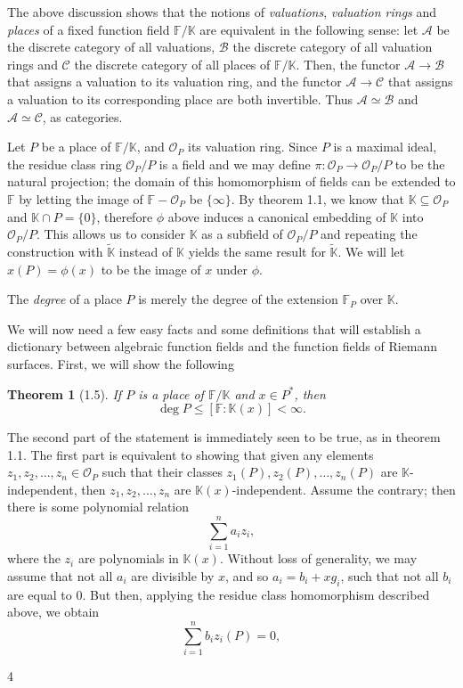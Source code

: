 \documentclass[11pt]{article}
\theoremstyle{scplain}
\newtheorem*{theorem}{Theorem}
\begin{document}
The above discussion shows that the notions of \emph{valuations}, \emph{valuation
rings} and \emph{places} of a fixed function field $\mathbb{F}/\mathbb{K}$ are
equivalent in the following sense: let $\mathcal{A}$ be the discrete category of
all valuations, $\mathcal{B}$ the discrete category of all valuation rings and
$\mathcal{C}$ the discrete category of all places of $\mathbb{F}/\mathbb{K}$.
Then, the functor $\mathcal{A} \longrightarrow \mathcal{B}$ that assigns a
valuation to its valuation ring, and the functor
$\mathcal{A} \longrightarrow \mathcal{C}$ that assigns a valuation to its
corresponding place are both invertible. Thus $\mathcal{A} \simeq \mathcal{B}$ and
$\mathcal{A} \simeq \mathcal{C}$, as categories.

Let $P$ be a place of $\mathbb{F}/\mathbb{K}$, and $\mathcal{O}_P$ its valuation
ring. Since $P$ is a maximal ideal, the residue class ring $\mathcal{O}_P/P$ is a
field and we may define $\pi : \mathcal{O}_P \longrightarrow \mathcal{O}_P/P$ to be
the natural projection; the domain of this homomorphism of fields can be extended
to $\mathbb{F}$ by letting the image of $\mathbb{F} - \mathcal{O}_P$ be
$\{\infty\}$. By theorem 1.1, we know that $\mathbb{K} \subseteq \mathcal{O}_P$ and
$\mathbb{K} \cap P = \{0\}$, therefore $\phi$ above induces a canonical embedding
of $\mathbb{K}$ into $\mathcal{O}_P/P$. This allows us to consider $\mathbb{K}$ as
a subfield of $\mathcal{O}_P/P$ and repeating the construction with
$\tilde{\mathbb{K}}$ instead of $\mathbb{K}$ yields the same result for
$\tilde{\mathbb{K}}$. We will let $x(P) = \phi(x)$ to be the image of $x$ under
$\phi$.

The \emph{degree} of a place $P$ is merely the degree of the extension
$\mathbb{F}_P$ over $\mathbb{K}$.

We will now need a few easy facts and some definitions that will establish a
dictionary between algebraic function fields and the function fields of Riemann
surfaces. First, we will show the following

\begin{theorem}[1.5]
If $P$ is a place of $\mathbb{F}/\mathbb{K}$ and $x \in P^*$, then
\[
  \deg P \leq [\mathbb{F} : \mathbb{K}(x)] < \infty.
\]
\end{theorem}

\medskip{} The second part of the statement is immediately
seen to be true, as in theorem 1.1. The first part is equivalent to showing that
given any elements $z_1, z_2, \ldots, z_n \in \mathcal{O}_P$ such that their
classes $z_1(P), z_2(P), \ldots, z_n(P)$ are $\mathbb{K}$-independent, then
$z_1, z_2, \ldots, z_n$ are $\mathbb{K}(x)$-independent. Assume the contrary; then
there is some polynomial relation
\[
  \sum_{i=1}^{n} a_i z_i,
\]
where the $z_i$ are polynomials in $\mathbb{K}(x)$. Without loss of generality, we
may assume that not all $a_i$ are divisible by $x$, and so $a_i = b_i + x g_i$,
such that not all $b_i$ are equal to $0$. But then, applying the residue class
homomorphism described above, we obtain
\[
  \sum_{i=1}^{n} b_i z_i(P) = 0,
\]

\begin{center}4\end{center}
\end{document}
